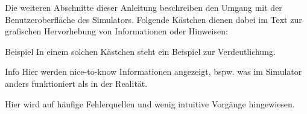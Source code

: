 Die weiteren Abschnitte dieser Anleitung beschreiben den Umgang mit der
Benutzeroberfläche des Simulators. Folgende Kästchen dienen dabei im Text zur
grafischen Hervorhebung von Informationen oder Hinweisen:
\begin{exampleblock}{Beispiel}
	In einem solchen Kästchen steht ein Beispiel zur Verdeutlichung.
\end{exampleblock}

\begin{infoblock}{Info}
	Hier werden nice-to-know Informationen angezeigt, bspw. was im Simulator anders funktioniert als in der Realität.
\end{infoblock}

\begin{warningblock}
	Hier wird auf häufige Fehlerquellen und wenig intuitive Vorgänge hingewiesen.
\end{warningblock}
